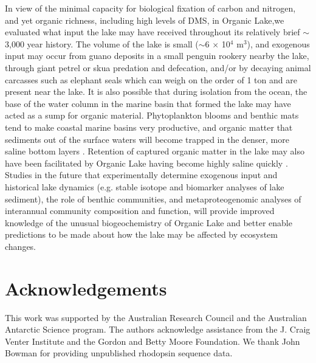 In view of the minimal capacity for biological fixation of carbon and nitrogen, and yet organic richness, including high levels of \ac{DMS}, in Organic Lake,we evaluated what input the lake may have received throughout its relatively brief $\sim$3,000 year history. 
The volume of the lake is small ($\sim$6 $\times$ 10$^4$ m$^3$), and exogenous input may occur from guano deposits in a small penguin rookery nearby the lake, through giant petrel or skua predation and defecation, and/or by decaying animal carcasses such as elephant seals which can weigh on the order of 1 ton and are present near the lake. 
It is also possible that during isolation from the ocean, the base of the water column in the marine basin that formed the lake may have acted as a sump for organic material. 
Phytoplankton blooms and benthic mats tend to make coastal marine basins very productive, and organic matter that sediments out of the surface waters will become trapped in the denser, more saline bottom layers \cite{Bird1991}. 
Retention of captured organic matter in the lake may also have been facilitated by Organic Lake having become highly saline quickly \cite{Bird1991}. 
Studies in the future that experimentally determine exogenous input and historical lake dynamics (e.g. stable isotope and biomarker analyses of lake sediment), the role of benthic communities, and metaproteogenomic analyses of interannual community composition and function, will provide improved knowledge of the unusual biogeochemistry of Organic Lake and better enable predictions to be made about how the lake may be affected by ecosystem changes.


\section{Acknowledgements}
This work was supported by the Australian Research Council and the Australian Antarctic Science program. 
The authors acknowledge assistance from the J. Craig Venter Institute and the Gordon and Betty Moore Foundation. 
We thank John Bowman for providing unpublished rhodopsin sequence data.
